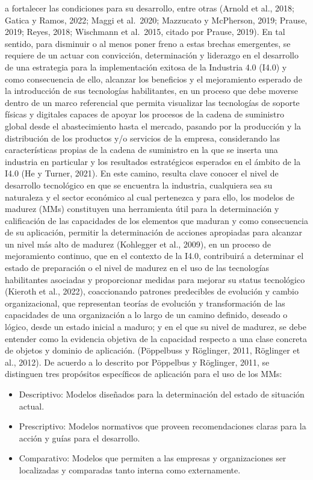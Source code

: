 \documentclass{article}
\providecommand{\tightlist}{%
  \setlength{\itemsep}{0pt}\setlength{\parskip}{0pt}}
\begin{document}
a fortalecer las condiciones para su desarrollo, entre otras (Arnold et
al., 2018; Gatica y Ramos, 2022; Maggi et al.~2020; Mazzucato y
McPherson, 2019; Prause, 2019; Reyes, 2018; Wischmann et al.~2015,
citado por Prause, 2019). En tal sentido, para disminuir o al menos
poner freno a estas brechas emergentes, se requiere de un actuar con
convicción, determinación y liderazgo en el desarrollo de una estrategia
para la implementación exitosa de la Industria 4.0 (I4.0) y como
consecuencia de ello, alcanzar los beneficios y el mejoramiento esperado
de la introducción de sus tecnologías habilitantes, en un proceso que
debe moverse dentro de un marco referencial que permita visualizar las
tecnologías de soporte físicas y digitales capaces de apoyar los
procesos de la cadena de suministro global desde el abastecimiento hasta
el mercado, pasando por la producción y la distribución de los productos
y/o servicios de la empresa, considerando las características propias de
la cadena de suministro en la que se inserta una industria en particular
y los resultados estratégicos esperados en el ámbito de la I4.0 (He y
Turner, 2021). En este camino, resulta clave conocer el nivel de
desarrollo tecnológico en que se encuentra la industria, cualquiera sea
su naturaleza y el sector económico al cual pertenezca y para ello, los
modelos de madurez (MMs) constituyen una herramienta útil para la
determinación y calificación de las capacidades de los elementos que
maduran y como consecuencia de su aplicación, permitir la determinación
de acciones apropiadas para alcanzar un nivel más alto de madurez
(Kohlegger et al., 2009), en un proceso de mejoramiento continuo, que en
el contexto de la I4.0, contribuirá a determinar el estado de
preparación o el nivel de madurez en el uso de las tecnologías
habilitantes asociadas y proporcionar medidas para mejorar su status
tecnológico (Kieroth et al., 2022), coaccionando patrones predecibles de
evolución y cambio organizacional, que representan teorías de evolución
y transformación de las capacidades de una organización a lo largo de un
camino definido, deseado o lógico, desde un estado inicial a maduro; y
en el que su nivel de madurez, se debe entender como la evidencia
objetiva de la capacidad respecto a una clase concreta de objetos y
dominio de aplicación. (Pöppelbuss y Röglinger, 2011, Röglinger et al.,
2012). De acuerdo a lo descrito por Pöppelbus y Röglinger, 2011, se
distinguen tres propósitos específicos de aplicación para el uso de los
MMs:

\begin{itemize}
\tightlist
\item
  Descriptivo: Modelos diseñados para la determinación del estado de
  situación actual.
\item
  Prescriptivo: Modelos normativos que proveen recomendaciones claras
  para la acción y guías para el desarrollo.
\item
  Comparativo: Modelos que permiten a las empresas y organizaciones ser
  localizadas y comparadas tanto interna como externamente.
\end{itemize}
\end{document}
